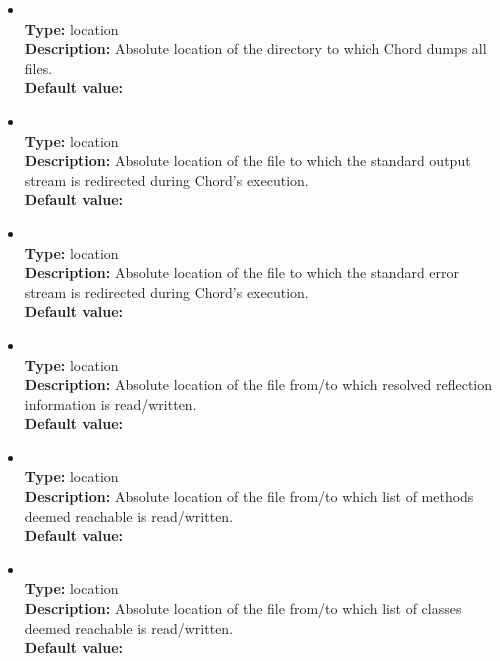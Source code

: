 \begin{itemize}
\item
{} \\
{\bf Type:} location \\
{\bf Description:} Absolute location of the directory to which Chord dumps all files. \\
{\bf Default value:}  

\item
{} \\
{\bf Type:} location \\
{\bf Description:} Absolute location of the file to which the standard output stream is redirected during Chord's execution. \\
{\bf Default value:} 

\item
{} \\
{\bf Type:} location \\
{\bf Description:} Absolute location of the file to which the standard error stream is redirected during Chord's execution. \\
{\bf Default value:} 

\item
{} \\
{\bf Type:} location \\
{\bf Description:} Absolute location of the file from/to which resolved reflection information is read/written. \\
{\bf Default value:} 

\item
{} \\
{\bf Type:} location \\
{\bf Description:} Absolute location of the file from/to which list of methods deemed reachable is read/written. \\
{\bf Default value:} 

\item
{} \\
{\bf Type:} location \\
{\bf Description:} Absolute location of the file from/to which list of classes deemed reachable is read/written. \\
{\bf Default value:} 


\end{itemize}
